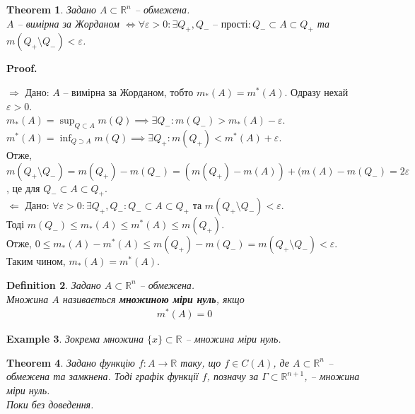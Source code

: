 \documentclass[a4paper, 10pt]{article}
\makeatletter
\def\huge{\displaystyle}
\def\qed{$\blacksquare$}
\def\rightproof{$\boxed{\Rightarrow}$ }
\def\leftproof{$\boxed{\Leftarrow}$ }
\theoremstyle{theoremdd}
\newtheorem{theorem}{Theorem}[subsection]
\theoremstyle{theoremdd}
\newtheorem{definition}[theorem]{Definition}
\theoremstyle{theoremdd}
\theoremstyle{theoremdd}
\theoremstyle{theoremdd}
\newtheorem{example}[theorem]{Example}
\theoremstyle{theoremdd}
\theoremstyle{theoremdd}
\theoremstyle{theoremdd}
\theoremstyle{theoremdd}
\theoremstyle{theoremdd}
\theoremstyle{theoremdd}
\theoremstyle{theoremdd}
\theoremstyle{theoremdd}
\theoremstyle{theoremdd}
\theoremstyle{theoremdd}
\renewenvironment{proof}[1][Proof.\\]{\par
\pushQED{\hfill \qed}%
\normalfont \topsep6\p@\@plus6\p@\relax
\trivlist
\item\relax
{\bfseries
#1\@addpunct{.}}\hspace\labelsep\ignorespaces
}{%
\popQED\endtrivlist\@endpefalse
}
\makeatother
\begin{document}
\begin{theorem}
Задано $A \subset \mathbb{R}^n$ -- обмежена.\\
$A$ -- вимірна за Жорданом $\iff \forall \varepsilon > 0: \exists Q_+,Q_- \text{ -- прості}: Q_- \subset A \subset Q_+$ та $m(Q_+ \setminus Q_-) < \varepsilon$.
\end{theorem}

\begin{proof}
\rightproof Дано: $A$ -- вимірна за Жорданом, тобто $m_*(A) = m^*(A)$. Одразу нехай $\varepsilon > 0$.\\
$m_*(A) = \huge\sup_{Q \subset A} m(Q) \implies \exists Q_-: m(Q_-) > m_*(A) - \varepsilon$.\\
$m^*(A) = \huge\inf_{Q \supset A} m(Q) \implies \exists Q_+: m(Q_+) < m^*(A) + \varepsilon$.\\
Отже, $m(Q_+ \setminus Q_-) = m(Q_+) - m(Q_-) = (m(Q_+)-m(A))+(m(A)-m(Q_-) = 2\varepsilon$, це для $Q_- \subset A \subset Q_+$.
\bigskip \\
\leftproof Дано: $\forall \varepsilon > 0: \exists Q_+,Q_-: Q_- \subset A \subset Q_+$ та $m(Q_+ \setminus Q_-) < \varepsilon$.\\
Тоді $m(Q_-) \leq m_*(A) \leq m^*(A) \leq m(Q_+)$.\\
Отже, $0 \leq m_*(A) - m^*(A) \leq m(Q_+) - m(Q_-) = m(Q_+ \setminus Q_-) < \varepsilon$.\\
Таким чином, $m_*(A) = m^*(A)$.
\end{proof}

\begin{definition}
Задано $A \subset \mathbb{R}^n$ -- обмежена.\\
Множина $A$ називається \textbf{множиною міри нуль}, якщо
\begin{align*}
m^*(A) = 0
\end{align*}
\end{definition}

\begin{example}
Зокрема множина $\{x\} \subset \mathbb{R}$ -- множина міри нуль.
\end{example}

\begin{theorem}
Задано функцію $f \colon A \to \mathbb{R}$ таку, що $f \in C(A)$, де $A \subset \mathbb{R}^n$ -- обмежена та замкнена. Тоді графік функції $f$, позначу за $\Gamma \subset \mathbb{R}^{n+1}$, -- множина міри нуль.\\
\textit{Поки без доведення.}
\end{theorem}
\end{document}
